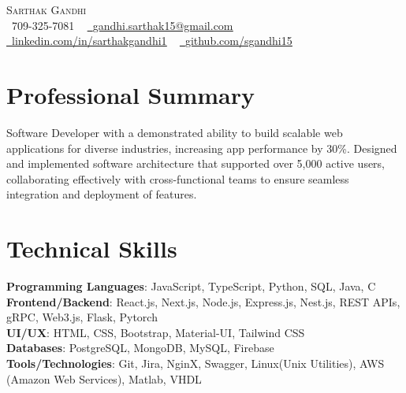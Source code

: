 \documentclass[letterpaper,11pt]{article}
\begin{document}
\begin{center}
    {\Huge \scshape Sarthak Gandhi} \\ \vspace{1pt}
    \small \raisebox{-0.1\height}\faPhone\ 709-325-7081 ~ 
    \href{mailto:gandhi.sarthak15@gmail.com}
    {\raisebox{-0.2\height}\faEnvelope\  {\underline{gandhi.sarthak15@gmail.com}}} ~ 
    \href{https://www.linkedin.com/in/sarthakgandhi1/}
    {\raisebox{-0.2\height}\faLinkedin\ {\underline{linkedin.com/in/sarthakgandhi1}}}  ~
    \href{https://github.com/sgandhi15}
    {\raisebox{-0.2\height}\faGithub\ {\underline{github.com/sgandhi15}}}
    \vspace{-8pt}
\end{center}


\section{Professional Summary}
Software Developer with a demonstrated ability to build scalable web applications for diverse industries, increasing app performance by 30\%. Designed and implemented software architecture that supported over 5,000 active users, collaborating effectively with cross-functional teams to ensure seamless integration and deployment of features.
\vspace{-8pt}

\section{Technical Skills}
\begin{itemize}[leftmargin=0.15in, label={}]
\small{\item{
\textbf{Programming Languages}{: JavaScript, TypeScript, Python, SQL, Java, C} \\
\textbf{Frontend/Backend}{: React.js, Next.js, Node.js, Express.js, Nest.js, REST APIs, gRPC, Web3.js, Flask, Pytorch} \\
\textbf{UI/UX}{: HTML, CSS, Bootstrap, Material-UI, Tailwind CSS} \\
\textbf{Databases}{: PostgreSQL, MongoDB, MySQL, Firebase} \\
\textbf{Tools/Technologies}{: Git, Jira, NginX, Swagger, Linux(Unix Utilities), AWS (Amazon Web Services), Matlab, VHDL} \\
}}
\end{itemize}
\vspace{-16pt}
\end{document}
